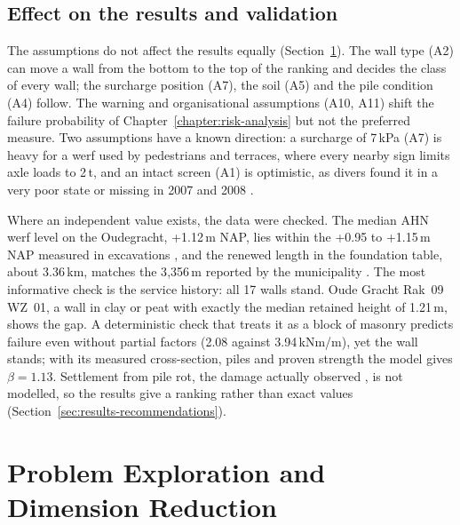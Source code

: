 \subsection{Effect on the results and validation}\label{sec:data-effect}

The assumptions do not affect the results equally
(Section~\ref{sec:dimension-reduction}). The wall type (A2) can move a wall
from the bottom to the top of the ranking and decides the class of every wall;
the surcharge position (A7), the soil (A5) and the pile condition (A4) follow.
The warning and organisational assumptions (A10, A11) shift the failure
probability of Chapter~\ref{chapter:risk-analysis} but not the preferred
measure. Two assumptions have a known direction: a surcharge of 7\,kPa (A7) is heavy for a werf used by
pedestrians and terraces, where every nearby sign limits axle loads to 2\,t,
and an intact screen (A1) is optimistic, as divers found it in a very poor
state or missing in 2007 and 2008 \parencite{ibu2010}.

Where an independent value exists, the data were checked. The median AHN werf
level on the Oudegracht, +1.12\,m NAP, lies within the
+0.95 to +1.15\,m NAP measured in excavations \parencite{erfgoed156,erfgoed158},
and the renewed length in the foundation table, about 3.36\,km, matches the
3{,}356\,m reported by the municipality \parencite{gu2025up}. The most
informative check is the service history: all 17 walls stand. Oude Gracht Rak~09 WZ~01, a wall in clay
or peat with exactly the median retained height of 1.21\,m, shows the gap. A
deterministic check that treats it as a block of masonry predicts failure even
without partial factors (2.08 against 3.94\,kNm/m), yet the wall stands; with
its measured cross-section, piles and proven strength the model gives
$\beta = 1.13$. Settlement
from pile rot, the damage actually observed \parencite{erfgoed156}, is not
modelled, so the results give a ranking rather than exact values
(Section~\ref{sec:results-recommendations}).

\clearpage
\section{Problem Exploration and Dimension Reduction}
\label{sec:dimension-reduction}


